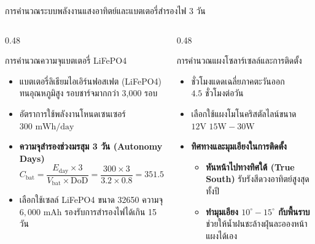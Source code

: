 \documentclass[aspectratio=169, 10pt]{beamer}
\begin{document}
\begin{frame}{การคำนวณระบบพลังงานแสงอาทิตย์และแบตเตอรี่สำรองไฟ 3 วัน}
\begin{columns}[T]
    \begin{column}{0.48\textwidth}
        \begin{mastercard}{การคำนวณความจุแบตเตอรี่ LiFePO4}
            \begin{itemize}
                \item แบตเตอรี่ลิเธียมไอเอิร์นฟอสเฟต (LiFePO4) ทนอุณหภูมิสูง รอบชาร์จมากกว่า 3,000 รอบ
                \item อัตราการใช้พลังงานโหนดเซนเซอร์ $300\text{ mWh/day}$
                \item \textbf{ความจุสำรองช่วงมรสุม 3 วัน (Autonomy Days)}
                \begin{equation*}
                    C_{\text{bat}} = \frac{E_{\text{day}} \times 3}{V_{\text{bat}} \times \text{DoD}} = \frac{300 \times 3}{3.2 \times 0.8} = 351.5\text{ mAh}
                \end{equation*}
                \item เลือกใช้เซลล์ LiFePO4 ขนาด 32650 ความจุ $6,000\text{ mAh}$ รองรับการสำรองไฟได้เกิน 15 วัน
            \end{itemize}
        \end{mastercard}
    \end{column}
    \begin{column}{0.48\textwidth}
        \begin{goldcard}{การคำนวณแผงโซลาร์เซลล์และการติดตั้ง}
            \begin{itemize}
                \item ชั่วโมงแดดเฉลี่ยภาคตะวันออก $4.5\text{ ชั่วโมงต่อวัน}$
                \item เลือกใช้แผงโมโนคริสตัลไลน์ขนาด $12\text{V } 15\text{W} - 30\text{W}$
                \item \textbf{ทิศทางและมุมเอียงในการติดตั้ง}
                \begin{itemize}
                    \item \textbf{หันหน้าไปทางทิศใต้ (True South)} รับรังสีดวงอาทิตย์สูงสุดทั้งปี
                    \item \textbf{ทำมุมเอียง $10^\circ - 15^\circ$ กับพื้นราบ} ช่วยให้น้ำฝนชะล้างฝุ่นละอองหน้าแผงได้เอง
                \end{itemize}
            \end{itemize}
        \end{goldcard}
    \end{column}
\end{columns}
\end{frame}
\end{document}
